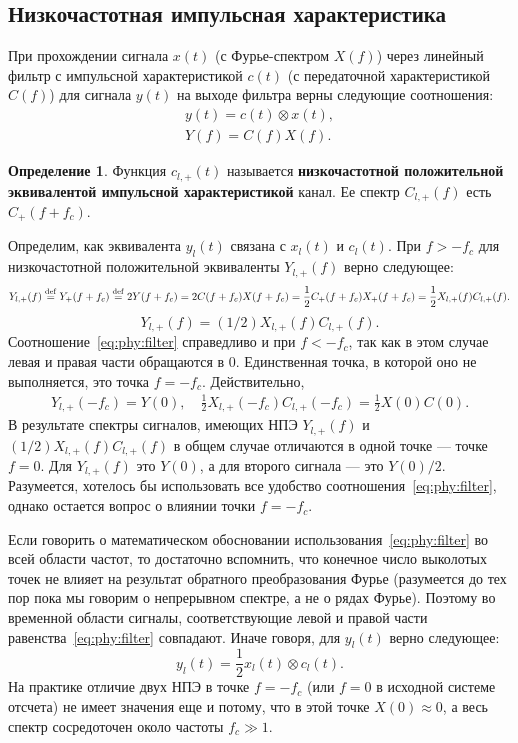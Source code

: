 \documentclass{book}
\numberwithin{theorem}{chapter}
\numberwithin{statement}{chapter}
\numberwithin{lemma}{chapter}
\theoremstyle{definition}
\numberwithin{task}{chapter}
\theoremstyle{remark}
\numberwithin{example}{chapter}
\theoremstyle{definition}
\newtheorem{definition}{Определение}
\numberwithin{definition}{chapter}
\theoremstyle{remark}
\theoremstyle{remark}
\numberwithin{lyrics}{section}
\begin{document}
\subsection{Низкочастотная импульсная характеристика}
\label{repr:low_imp_char}
При прохождении сигнала $x(t)$  (с Фурье-спектром $X(f)$) через линейный фильтр с импульсной характеристикой $c(t)$ (с передаточной характеристикой $C(f)$) для сигнала $y(t)$ на выходе фильтра верны следующие соотношения:
\begin{gather*}
y(t) = c(t) \otimes x(t),\\
Y(f) = C(f) X(f).
\end{gather*}
\begin{definition}
Функция $c_{l,+}(t)$ называется \textbf{низкочастотной положительной эквивалентой импульсной характеристикой} канал. Ее спектр $C_{l,+}(f)$ есть $C_{+}(f + f_c)$.
\end{definition}
Определим, как эквивалента $y_l(t)$ связана с $x_l(t)$ и $c_l(t)$. При $f > -f_c$ для низкочастотной положительной эквиваленты $Y_{l,+}(f)$ верно следующее:
\begin{gather*}
Y_{l,+}(f) \mathrel{\stackrel{\rm def}=} Y_{+}(f + f_c) \mathrel{\stackrel{\rm def}=} 2 Y(f + f_c) = 2 C(f + f_c) X(f + f_c) = \frac{1}{2} C_+(f + f_c) X_+(f + f_c) = \frac{1}{2} X_{l,+}(f) C_{l,+}(f).
\end{gather*}
\begin{equation}
\label{eq:phy:filter}
Y_{l,+}(f) = (1/2) X_{l,+}(f) C_{l,+}(f).
\end{equation}
Соотношение~\eqref{eq:phy:filter} справедливо и при $f < -f_c$, так как в этом случае левая и правая части обращаются в 0. Единственная точка, в которой оно не выполняется, это точка $f = -f_c$. Действительно,
\begin{gather*}
Y_{l,+}(-f_c) = Y(0), \quad \frac{1}{2} X_{l,+}(-f_c) C_{l,+}(-f_c) = \frac{1}{2} X(0) C(0).
\end{gather*}
В результате спектры сигналов, имеющих НПЭ $Y_{l,+}(f)$ и $(1/2) X_{l,+}(f) C_{l,+}(f)$ в общем случае отличаются в одной точке --- точке $f = 0$. Для 
$Y_{l,+}(f)$ это $Y(0)$, а для второго сигнала --- это $Y(0) / 2$. Разумеется, хотелось бы использовать все удобство соотношения~\eqref{eq:phy:filter}, однако остается вопрос о влиянии точки $f = -f_c$. 

Если говорить о математическом обосновании использования~\eqref{eq:phy:filter} во всей области частот, то достаточно вспомнить, что конечное число выколотых точек не влияет на результат обратного преобразования Фурье (разумеется до тех пор пока мы говорим о непрерывном спектре, а не о рядах Фурье). Поэтому во временной области сигналы, соответствующие левой и правой части равенства~\eqref{eq:phy:filter} совпадают. Иначе говоря, для $y_l(t)$ верно следующее:
\begin{equation}
\label{eq:phy:low_filter}
y_l(t) = \frac{1}{2} x_l(t) \otimes c_l(t).
\end{equation}
На практике отличие двух НПЭ в точке $f = -f_c$ (или $f = 0$ в исходной системе отсчета) не имеет значения еще и потому, что в этой точке $X(0) \approx 0$, а весь спектр сосредоточен около частоты $f_c \gg 1$.
\end{document}
